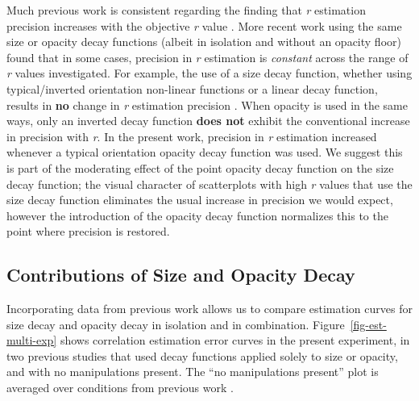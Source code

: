 \documentclass[sigconf]{acmart}
\begin{document}
Much previous work is consistent regarding the finding that \emph{r}
estimation precision increases with the objective \emph{r} value
\citep{rensink_2010, rensink_2012, rensink_2014, rensink_2017, doherty_2007}.
More recent work using the same size or opacity decay functions (albeit
in isolation and without an opacity floor)
\citep{strain_2023, strain_2023b} found that in some cases, precision in
\emph{r} estimation is \emph{constant} across the range of \emph{r}
values investigated. For example, the use of a size decay function,
whether using typical/inverted orientation non-linear functions or a
linear decay function, results in \textbf{no} change in \emph{r}
estimation precision \citep{strain_2023b}. When opacity is used in the
same ways, only an inverted decay function \textbf{does not} exhibit the
conventional increase in precision with \emph{r}. In the present work,
precision in \emph{r} estimation increased whenever a typical
orientation opacity decay function was used. We suggest this is part of
the moderating effect of the point opacity decay function on the size
decay function; the visual character of scatterplots with high \emph{r}
values that use the size decay function eliminates the usual increase in
precision we would expect, however the introduction of the opacity decay
function normalizes this to the point where precision is restored.

\hypertarget{contributions-of-size-and-opacity-decay}{%
\subsection{Contributions of Size and Opacity
Decay}\label{contributions-of-size-and-opacity-decay}}

Incorporating data from previous work \citep{strain_2023, strain_2023b}
allows us to compare estimation curves for size decay and opacity decay
in isolation and in combination. Figure~\ref{fig-est-multi-exp} shows
correlation estimation error curves in the present experiment, in two
previous studies that used decay functions applied solely to size or
opacity, and with no manipulations present. The ``no manipulations
present'' plot is averaged over conditions from previous work
\citep{strain_2023, strain_2023b}.
\end{document}
